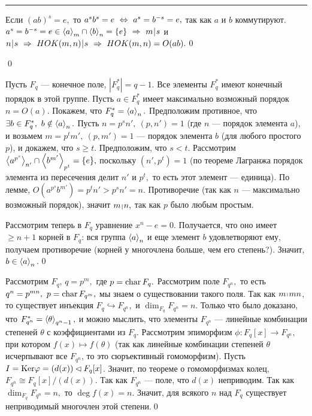 \smallskip
\hrule \rule{0pt}{10pt}

\dok Если $(ab)^s=e,$ то $a^sb^s=e\ \Leftrightarrow\  a^s=b^{-s}=e,$ так как $a$ и $b$ коммутируют. $a^s=b^{-s}=e\in \lob{a}_m\cap \lob{b}_n=\{e\}\ra m\,\vrule\,s$ и $n\,\vrule\,s\ra HOK(m,n)\,\vrule\,s\ra HOK(m,n)=O(ab).$\qquad\qed

\quad\qed
{}

\dok Пусть $F_q$ --- конечное поле, $|F_q^*|=q-1.$ Все элементы $F_q^*$ имеют конечный порядок в этой группе. Пусть $a\in F_q^*$ имеет максимально возможный порядок $n=O(a).$
Покажем, что $F_q^*=\left\langle a\right\rangle_n.$ Предположим противное, что $\exists b\in F_q^*,\ b\notin\left\langle a\right\rangle_n.$
Пусть $n=p^sn',\ (p,n')=1$ (где $n$ --- порядок элемента $a$), и возьмем $m=p^tm',\ (p,m')=1$ --- порядок элемента $b$ (для любого простого $p$), и докажем, что $s\ge t.$
Предположим, что $s<t.$ Рассмотрим $\left\langle a^{p^s}\right\rangle_{n'}\cap\left\langle b^{m'}\right\rangle_{p^t}=\{e\},$ поскольку $(n', p^t)=1$ (по теореме Лагранжа порядок элемента из пересечения делит $n'$ и $p^t,$ то есть этот элемент --- единица).
По лемме, $O(a^{p^s}b^{m'})=p^tn'>p^sn'=n.$ Противоречие (так как $n$ --- максимально возможный порядок), значит $m\,\vrule\,n,$ так как $p$ было любым простым.

Рассмотрим теперь в $F_q$ уравнение $x^n-e=0.$ Получается, что оно имеет $\ge n+1$ корней в $F_q$: вся группа $\left\langle a\right\rangle_n$ и еще элемент $b$ удовлетворяют ему,
получаем противоречие (корней у многочлена больше, чем его степень?). Значит, $b\in\left\langle a\right\rangle_n.$\qquad\qed


\dok Рассмотрим $F_q$, $q=p^m,$ где $p={\rm char\,}F_q.$ Рассмотрим поле $F_{q^n},$ то есть $q^n=p^{mn},\ p=\rr{char\,}F_{q^m},$ мы знаем о существовании такого поля.
Так как $m\,\vrule\,mn$, то существует инъекция $F_q\hookrightarrow F_{q^n},$ и $\dim_{F_q}{F_{q^n}}=n.$ Только что было доказано, что $F^*_{q^n}=\left\langle\theta\right\rangle_{q^n-1},$ и
можно мыслить, что элементы $F_{q^n}$ --- линейные комбинации степеней $\theta$ с коэффициентами из $F_q$.
Рассмотрим эпиморфизм $\phi : F_q[x]\rightarrow F_{q^n},$ при котором $f(x)\mapsto f(\theta)$ (так как линейные комбинации степеней $\theta$ исчерпывают все $F_{q^n}$, то это сюръективный гомоморфизм).
Пусть $I={\rm Ker}\varphi=(d(x)) \lhd F_{q}[x]$. Значит, по теореме о гомоморфизмах колец, $F_{q^n}\cong F_q[x]/(d(x)).$ Так как $F_{q^n}$ --- поле, что $d(x)$ неприводим.
Так как $\dim_{F_q}{F_{q^n}}=n,$ то $\deg f(x)=n.$ Значит, для всякого $n$ над $F_q$ существует неприводимый многочлен этой степени.\qquad\qed
\smallskip

